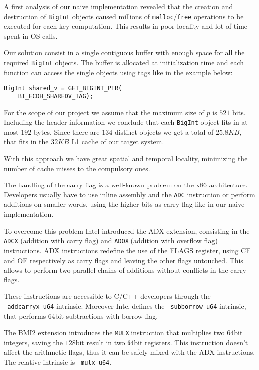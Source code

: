 A first analysis of our naive implementation revealed that the creation and destruction of \texttt{BigInt} objects caused millions of \texttt{malloc}/\texttt{free} operations to be executed for each key computation. This results in poor locality and lot of time spent in OS calls.

Our solution consist in a single contiguous buffer with enough space for all the required \texttt{BigInt} objects. The buffer is allocated at initialization time and each function can access the single objects using tags like in the example below:

\begin{lstlisting}[frame=single, mathescape=true, captionpos=b, caption=Access by tag example]
BigInt shared_v = GET_BIGINT_PTR(
    BI_ECDH_SHAREDV_TAG);
\end{lstlisting}

For the scope of our project we assume that the maximum size of $p$ is $521$ bits. Including the header information we conclude that each \texttt{BigInt} object fits in at most $192$ bytes. Since there are $134$ distinct objects we get a total of $25.8KB$, that fits in the $32KB$ L1 cache of our target system.

With this approach we have great spatial and temporal locality, minimizing the number of cache misses to the compulsory ones.

The handling of the carry flag is a well-known problem on the x86 architecture. Developers usually have to use inline assembly and the \texttt{ADC} instruction or perform additions on smaller words, using the higher bits as carry flag like in our naive implementation.

To overcome this problem Intel introduced the ADX extension, consisting in the \texttt{ADCX} (addition with carry flag) and \texttt{ADOX} (addition with overflow flag) instructions. ADX instructions redefine the use of the FLAGS register, using CF and OF respectively as carry flags and leaving the other flags untouched. This allows to perform two parallel chains of additions without conflicts in the carry flags.

These instructions are accessible to C/C++ developers through the \texttt{\_addcarryx\_u64} intrinsic. Moreover Intel defines the \texttt{\_subborrow\_u64} intrinsic, that performs $64$bit subtractions with borrow flag.

The BMI2 extension introduces the \texttt{MULX} instruction that multiplies two $64$bit integers, saving the $128$bit result in two $64$bit registers. This instruction doesn't affect the arithmetic flags, thus it can be safely mixed with the ADX instructions. The relative intrinsic is \texttt{\_mulx\_u64}. 

